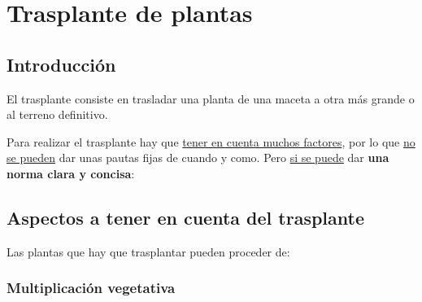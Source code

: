 \documentclass[a4paper,12pt,oneside]{article}
\begin{document}
\section{Trasplante de plantas}
\label{sec:org3810d69}
\subsection{Introducción}
\label{sec:orga0d2a39}
El trasplante consiste en trasladar una planta de una maceta a otra más grande
o al terreno definitivo.

Para realizar el trasplante hay que \uline{tener en cuenta muchos factores}, por lo
que \uline{no se pueden} dar unas pautas fijas de cuando y como. Pero \uline{si se puede}
dar \textbf{una norma clara y concisa}:


\subsection{Aspectos a tener en cuenta del trasplante}
\label{sec:org70dbea4}
Las plantas que hay que trasplantar pueden proceder de:
\subsubsection{Multiplicación vegetativa}
\label{sec:org441252d}
\end{document}
